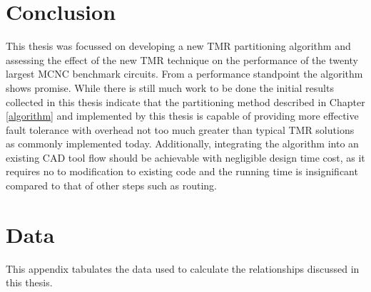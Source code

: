 \documentclass[12pt,final,oneside]{dwThesis} %
\begin{document}
   \chapter{Conclusion}
   This thesis was focussed on developing a new TMR
   partitioning algorithm and assessing the effect of the new \gls{TMR}
   technique on the performance of the twenty largest \gls{MCNC} benchmark circuits. From a performance
   standpoint the algorithm shows promise. While there is still much work to be
   done the initial results collected in this thesis indicate that the
   partitioning method described in Chapter \ref{algorithm} and implemented by this
   thesis is capable of providing more effective fault tolerance with overhead
   not too much greater than typical \gls{TMR} solutions as commonly
   implemented today. Additionally, integrating the algorithm into an existing \gls{CAD} tool flow 
   should be achievable with negligible design time cost, as it requires no to modification to existing code and
   the running time is insignificant compared to that of other steps such as routing.


   \appendix 
   \chapter{Data}
   This appendix tabulates the data used to
   calculate the relationships discussed in this thesis.
\end{document}
